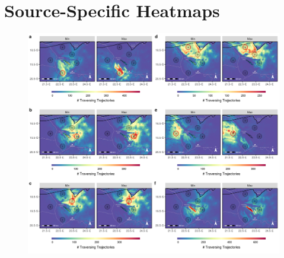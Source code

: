 \documentclass[abstract=on,10pt,a4paper,bibliography=totocnumbered]{article}
\begin{document}
\section{Source-Specific Heatmaps}
\begin{figure}[htbp]
  \begin{center}
  \includegraphics[width = \textwidth]{99_HeatmapsIndividual.png}
  \caption{}
  \label{Heatmaps}
  \end{center}
\end{figure}

\newpage
\end{document}
